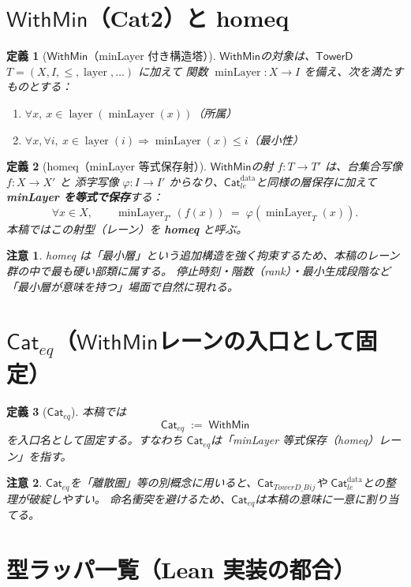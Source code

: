 \documentclass[a4paper,12pt]{ltjsarticle}
\newtheorem{definition}{定義}[section]
\newtheorem{remark}{注意}[section]
\newcommand{\TowerD}{\ensuremath{\mathsf{TowerD}}}
\newcommand{\Catledata}{\ensuremath{\mathsf{Cat}_{le}^{\text{data}}}}
\newcommand{\CatTowerDBij}{\ensuremath{\mathsf{Cat}_{TowerD\_Bij}}}
\newcommand{\WithMin}{\ensuremath{\mathsf{WithMin}}}
\newcommand{\Cateq}{\ensuremath{\mathsf{Cat}_{eq}}}
\newcommand{\minLayer}{\operatorname{minLayer}}
\newcommand{\layer}{\operatorname{layer}}
\begin{document}
\section{\WithMin（Cat2）と homeq}

\begin{definition}[\WithMin（minLayer 付き構造塔）]
\WithMin の対象は、\TowerD \(T=(X,I,\le,\layer,\ldots)\) に加えて
関数 \(\minLayer : X\to I\) を備え、次を満たすものとする：
\begin{enumerate}[label=(\alph*)]
  \item \(\forall x,\ x\in \layer(\minLayer(x))\)（所属）
  \item \(\forall x,\forall i,\ x\in \layer(i)\Rightarrow \minLayer(x)\le i\)（最小性）
\end{enumerate}
\end{definition}

\begin{definition}[homeq（minLayer 等式保存射）]
\WithMin の射 \(f:T\to T'\) は、台集合写像 \(f:X\to X'\) と
添字写像 \(\varphi:I\to I'\) からなり、\Catledata と同様の層保存に加えて
\textbf{minLayer を等式で保存}する：
\[
\forall x\in X,\qquad
\minLayer_{T'}(f(x)) \;=\; \varphi(\minLayer_T(x)).
\]
本稿ではこの射型（レーン）を \textbf{homeq} と呼ぶ。
\end{definition}

\begin{remark}
homeq は「最小層」という追加構造を強く拘束するため、本稿のレーン群の中で最も硬い部類に属する。
停止時刻・階数（rank）・最小生成段階など「最小層が意味を持つ」場面で自然に現れる。
\end{remark}

\section{\Cateq（\WithMin レーンの入口として固定）}

\begin{definition}[\Cateq]
本稿では
\[
\Cateq \;:=\; \WithMin
\]
を入口名として固定する。すなわち \Cateq は「minLayer 等式保存（homeq）レーン」を指す。
\end{definition}

\begin{remark}
\Cateq を「離散圏」等の別概念に用いると、\CatTowerDBij や \Catledata との整理が破綻しやすい。
命名衝突を避けるため、\Cateq は本稿の意味に一意に割り当てる。
\end{remark}

\appendix
\section{型ラッパ一覧（Lean 実装の都合）}
\end{document}
